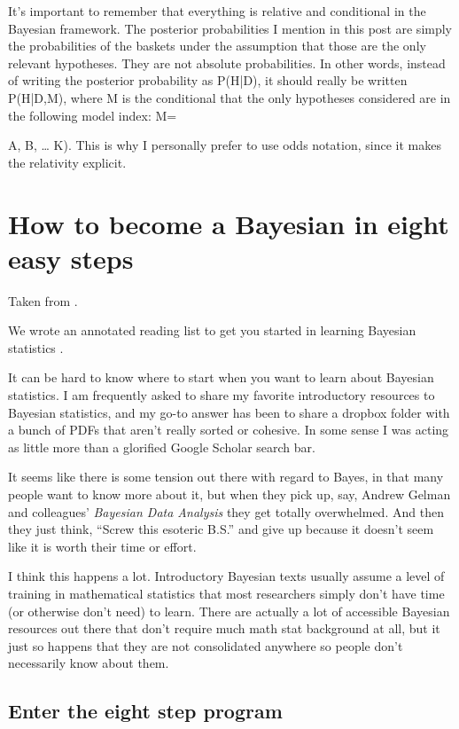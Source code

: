 It's important to remember that everything is relative and conditional in the Bayesian framework. The posterior probabilities I mention in this post are simply the probabilities of the baskets under the assumption that those are the only relevant hypotheses. They are not absolute probabilities. In other words, instead of writing the posterior probability as P(H|D), it should really be written P(H|D,M), where M is the conditional that the only hypotheses considered are in the following model index: M= {A, B, … K). This is why I personally prefer to use odds notation, since it makes the relativity explicit.


\section{How to become a Bayesian in eight easy steps}
\label{sec:HowtobecomeaBayesianineighteasysteps}

Taken from  \cite{etz2016a}. 

We wrote an annotated reading list to get you started in learning Bayesian statistics \cite{etz2018a}.

It can be hard to know where to start when you want to learn about Bayesian statistics. I am frequently asked to share my favorite introductory resources to Bayesian statistics, and my go-to answer has been to share a dropbox folder with a bunch of PDFs that aren't really sorted or cohesive. In some sense I was acting as little more than a glorified Google Scholar search bar.

It seems like there is some tension out there with regard to Bayes, in that many people want to know more about it, but when they pick up, say, Andrew Gelman and colleagues' \textit{Bayesian Data Analysis} they get totally overwhelmed. And then they just think, ``Screw this esoteric B.S.'' and give up because it doesn't seem like it is worth their time or effort.

I think this happens a lot. Introductory Bayesian texts usually assume a level of training in mathematical statistics that most researchers simply don't have time (or otherwise don't need) to learn. There are actually a lot of accessible Bayesian resources out there that don't require much math stat background at all, but it just so happens that they are not consolidated anywhere so people don't necessarily know about them.

\subsection{Enter the eight step program}

}
